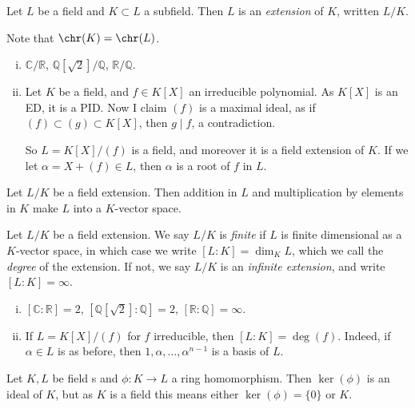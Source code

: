 \documentclass[12pt]{article}
\begin{document}
\begin{definition}
	Let $L$ be a field and $K \subset L$ a subfield. Then $L$ is an \emph{extension} of $K$, written $L/K$.
\end{definition}

Note that $\chr(K) = \chr(L)$.

\begin{exbox}
	\begin{enumerate}[(i)]
		\item $\mathbb{C}/\mathbb{R}$, $\mathbb{Q}[\sqrt 2]/\mathbb{Q}$, $\mathbb{R}/\mathbb{Q}$.
		\item Let $K$ be a field, and $f \in K[X]$ an irreducible polynomial. As $K[X]$ is an ED, it is a PID. Now I claim $(f)$ is a maximal ideal, as if $(f) \subset (g) \subset K[X]$, then $g \mid f$, a contradiction.

			So $L = K[X]/(f)$ is a field, and moreover it is a field extension of $K$. If we let $\alpha = X + (f) \in L$, then $\alpha$ is a root of $f$ in $L$.
	\end{enumerate}
\end{exbox}

Let $L/K$ be a field extension. Then addition in $L$ and multiplication by elements in $K$ make $L$ into a $K$-vector space.

\begin{definition}
	Let $L/K$ be a field extension. We say $L/K$ is \emph{finite} if $L$ is finite dimensional as a $K$-vector space, in which case we write $[L:K] = \dim_K L$, which we call the \emph{degree} of the extension. If not, we say $L/K$ is an \emph{infinite extension}, and write $[L:K] = \infty$.
\end{definition}

\begin{exbox}
	\begin{enumerate}[(i)]
		\item $[\mathbb{C}: \mathbb{R}] = 2$, $[\mathbb{Q}[\sqrt 2] : \mathbb{Q}] = 2$, $[\mathbb{R} : \mathbb{Q}] = \infty$.
		\item If $L = K[X]/(f)$ for $f$ irreducible, then $[L:K] = \deg(f)$. Indeed, if $\alpha \in L$ is as before, then $1, \alpha, \ldots, \alpha^{n-1}$ is a basis of $L$.
	\end{enumerate}
\end{exbox}

Let $K, L$ be field s and $\phi : K \to L$ a ring homomorphism. Then $\ker(\phi)$ is an ideal of $K$, but as $K$ is a field this means either $\ker(\phi) = \{0\}$ or $K$.
\end{document}
